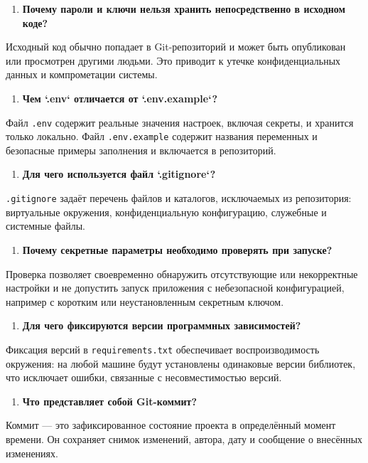 \documentclass[12pt,a4paper]{article}
\begin{document}
\begin{enumerate}
\item \textbf{Почему пароли и ключи нельзя хранить непосредственно в исходном коде?}
\end{enumerate}
Исходный код обычно попадает в Git-репозиторий и может быть опубликован или просмотрен другими людьми. Это приводит к утечке конфиденциальных данных и компрометации системы.

\begin{enumerate}
\item \textbf{Чем `.env` отличается от `.env.example`?}
\end{enumerate}
Файл \texttt{.\allowbreak{}env} содержит реальные значения настроек, включая секреты, и хранится только локально. Файл \texttt{.\allowbreak{}env.\allowbreak{}example} содержит названия переменных и безопасные примеры заполнения и включается в репозиторий.

\begin{enumerate}
\item \textbf{Для чего используется файл `.gitignore`?}
\end{enumerate}
\texttt{.\allowbreak{}gitignore} задаёт перечень файлов и каталогов, исключаемых из репозитория: виртуальные окружения, конфиденциальную конфигурацию, служебные и системные файлы.

\begin{enumerate}
\item \textbf{Почему секретные параметры необходимо проверять при запуске?}
\end{enumerate}
Проверка позволяет своевременно обнаружить отсутствующие или некорректные настройки и не допустить запуск приложения с небезопасной конфигурацией, например с коротким или неустановленным секретным ключом.

\begin{enumerate}
\item \textbf{Для чего фиксируются версии программных зависимостей?}
\end{enumerate}
Фиксация версий в \texttt{requirements.\allowbreak{}txt} обеспечивает воспроизводимость окружения: на любой машине будут установлены одинаковые версии библиотек, что исключает ошибки, связанные с несовместимостью версий.

\begin{enumerate}
\item \textbf{Что представляет собой Git-коммит?}
\end{enumerate}
Коммит — это зафиксированное состояние проекта в определённый момент времени. Он сохраняет снимок изменений, автора, дату и сообщение о внесённых изменениях.
\end{document}
